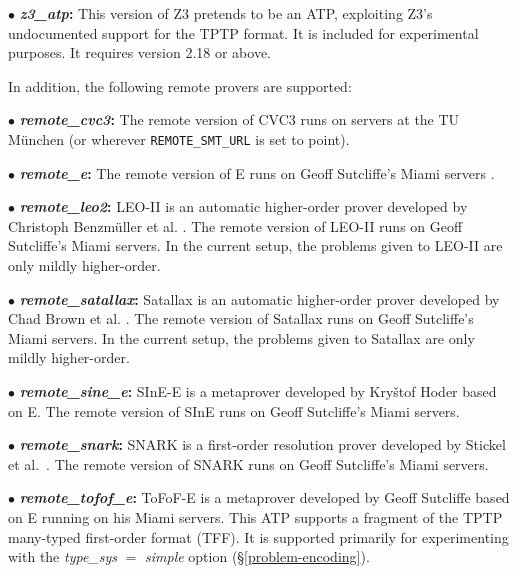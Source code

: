 \documentclass[a4paper,12pt]{article}
\begin{document}
\begin{enum}
\begin{enum}
\item[$\bullet$] \textbf{\textit{z3\_atp}:} This version of Z3 pretends to be an
ATP, exploiting Z3's undocumented support for the TPTP format. It is included
for experimental purposes. It requires version 2.18 or above.
\end{enum}

In addition, the following remote provers are supported:

\begin{enum}
\item[$\bullet$] \textbf{\textit{remote\_cvc3}:} The remote version of CVC3 runs
on servers at the TU M\"unchen (or wherever \texttt{REMOTE\_SMT\_URL} is set to
point).

\item[$\bullet$] \textbf{\textit{remote\_e}:} The remote version of E runs
on Geoff Sutcliffe's Miami servers \cite{sutcliffe-2000}.

\item[$\bullet$] \textbf{\textit{remote\_leo2}:} LEO-II is an automatic
higher-order prover developed by Christoph Benzm\"uller et al. \cite{leo2}. The
remote version of LEO-II runs on Geoff Sutcliffe's Miami servers. In the current
setup, the problems given to LEO-II are only mildly higher-order.

\item[$\bullet$] \textbf{\textit{remote\_satallax}:} Satallax is an automatic
higher-order prover developed by Chad Brown et al. \cite{satallax}. The remote
version of Satallax runs on Geoff Sutcliffe's Miami servers. In the current
setup, the problems given to Satallax are only mildly higher-order.

\item[$\bullet$] \textbf{\textit{remote\_sine\_e}:} SInE-E is a metaprover
developed by Kry\v stof Hoder \cite{sine} based on E. The remote version of
SInE runs on Geoff Sutcliffe's Miami servers.

\item[$\bullet$] \textbf{\textit{remote\_snark}:} SNARK is a first-order
resolution prover developed by Stickel et al.\ \cite{snark}. The remote version
of SNARK runs on Geoff Sutcliffe's Miami servers.

\item[$\bullet$] \textbf{\textit{remote\_tofof\_e}:} ToFoF-E is a metaprover
developed by Geoff Sutcliffe \cite{tofof} based on E running on his Miami
servers. This ATP supports a fragment of the TPTP many-typed first-order format
(TFF). It is supported primarily for experimenting with the
\textit{type\_sys} $=$ \textit{simple} option (\S\ref{problem-encoding}).


\end{enum}
\end{enum}
\end{document}
